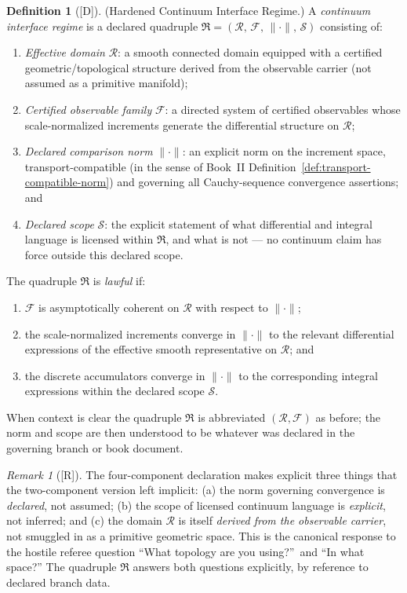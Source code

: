 \documentclass[12pt,oneside]{amsbook}
\theoremstyle{plain}
\theoremstyle{definition}
\newtheorem{definition}[theorem]{Definition}
\theoremstyle{remark}
\newtheorem{remark}[theorem]{Remark}
\newcommand{\status}[1]{\textup{[#1]}}
\begin{document}
\begin{definition}[\status{D}]\label{def:continuum-interface-regime}
\textup{(Hardened Continuum Interface Regime.)}
A \emph{continuum interface regime} is a declared quadruple
$\mathfrak{R} = (\mathcal{R},\, \mathcal{F},\, \|\cdot\|,\, \mathcal{S})$
consisting of:
\begin{enumerate}[label=\textup{(\arabic*)}]
  \item \emph{Effective domain} $\mathcal{R}$: a smooth connected
    domain equipped with a certified geometric/topological structure
    derived from the observable carrier (not assumed as a primitive
    manifold);
  \item \emph{Certified observable family} $\mathcal{F}$: a
    directed system of certified observables whose scale-normalized
    increments generate the differential structure on $\mathcal{R}$;
  \item \emph{Declared comparison norm} $\|\cdot\|$: an
    explicit norm on the increment space, transport-compatible
    (in the sense of Book~II Definition~\ref{def:transport-compatible-norm})
    and governing all Cauchy-sequence convergence assertions; and
  \item \emph{Declared scope} $\mathcal{S}$: the explicit
    statement of what differential and integral language is
    licensed within $\mathfrak{R}$, and what is not --- no
    continuum claim has force outside this declared scope.
\end{enumerate}
The quadruple $\mathfrak{R}$ is \emph{lawful} if:
\begin{enumerate}[label=\textup{(\alph*)}]
  \item $\mathcal{F}$ is asymptotically coherent on $\mathcal{R}$
    with respect to $\|\cdot\|$;
  \item the scale-normalized increments converge in $\|\cdot\|$
    to the relevant differential expressions of the effective smooth
    representative on $\mathcal{R}$; and
  \item the discrete accumulators converge in $\|\cdot\|$ to the
    corresponding integral expressions within the declared scope
    $\mathcal{S}$.
\end{enumerate}
When context is clear the quadruple $\mathfrak{R}$ is abbreviated
$(\mathcal{R}, \mathcal{F})$ as before; the norm and scope are
then understood to be whatever was declared in the governing branch
or book document.
\end{definition}

\begin{remark}[\status{R}]\label{rem:quadruple-regime-significance}
The four-component declaration makes explicit three things that the
two-component version left implicit: (a) the norm governing
convergence is \emph{declared}, not assumed; (b) the scope of
licensed continuum language is \emph{explicit}, not inferred; and
(c) the domain $\mathcal{R}$ is itself \emph{derived from the
observable carrier}, not smuggled in as a primitive geometric space.
This is the canonical response to the hostile referee question
``What topology are you using?''\ and ``In what space?''  The
quadruple $\mathfrak{R}$ answers both questions explicitly, by
reference to declared branch data.
\end{remark}
\end{document}
